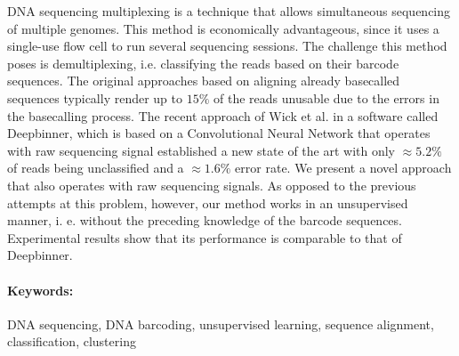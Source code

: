 \documentclass[12pt, twoside]{book}
\begin{document}
DNA sequencing multiplexing is a technique that allows simultaneous sequencing of multiple genomes. This method is economically advantageous, since it uses a single-use flow cell to run several sequencing sessions. The challenge this method poses is demultiplexing, i.e. classifying the reads based on their barcode sequences. The original approaches based on aligning already basecalled sequences typically render up to $15\%$ of the reads unusable due to the errors in the basecalling process. The recent approach of Wick et al. \cite{Deepbinner} in a software called Deepbinner, which is based on a Convolutional Neural Network that operates with raw sequencing signal established a new state of the art with only $\approx 5.2\%$ of reads being unclassified and a $\approx 1.6\%$ error rate. We present a novel approach that also operates with raw sequencing signals. As opposed to the previous attempts at this problem, however, our method works in an unsupervised manner, i. e. without the preceding knowledge of the barcode sequences. Experimental results show that its performance is comparable to that of Deepbinner.


\paragraph*{Keywords:} DNA sequencing, DNA barcoding, unsupervised learning, sequence alignment, classification, clustering


%
%



\newpage 

\tableofcontents



\newpage 
\end{document}
